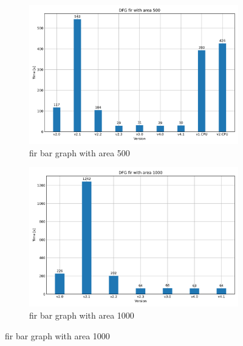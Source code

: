 \begin{figure}[!h]
    \centering
    \begin{subfigure}{.45\textwidth}
        \centering
        \includegraphics[width=.95\linewidth]{chapters/figures/fir_500.png}  
        \caption{fir bar graph with area 500}
        \label{fig:fir_500}
    \end{subfigure}
    \begin{subfigure}{.45\textwidth}
        \centering
        \includegraphics[width=.95\linewidth]{chapters/figures/fir_1000.png}  
        \caption{fir bar graph with area 1000}
        \label{fig:fir_1000}
    \end{subfigure}
\end{figure}

